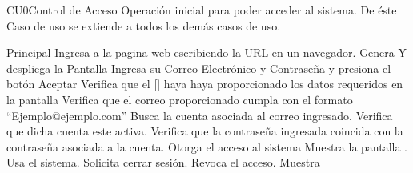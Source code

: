  \begin{UseCase}{CU0}{Control de Acceso}{
		Operación inicial para poder acceder al sistema. De éste Caso de uso se extiende a todos los demás casos de uso.
	}
	\end{UseCase}
	\begin{UCtrayectoria}{Principal}
		\UCpaso[\UCactor] Ingresa a la pagina web escribiendo la URL en un navegador.
		\UCpaso Genera Y despliega la Pantalla 
		\UCpaso [\UCactor] Ingresa su Correo Electrónico y Contraseña y presiona el botón Aceptar
		\UCpaso Verifica que el [\UCactor] haya haya proporcionado los datos requeridos en la pantalla 
		\UCpaso Verifica que el correo proporcionado cumpla con el formato ``Ejemplo@ejemplo.com'' 
		\UCpaso Busca la cuenta asociada al correo ingresado. 
		\UCpaso Verifica que dicha cuenta este activa. 
		\UCpaso Verifica que la contraseña ingresada coincida con la contraseña asociada a la cuenta.
		\UCpaso Otorga el acceso al sistema
		\UCpaso Muestra la pantalla .		
		\UCpaso [\UCactor] Usa el sistema.
		\UCpaso [\UCactor] Solicita cerrar sesión.
		\UCpaso Revoca el acceso.
		\UCpaso Muestra 		
	\end{UCtrayectoria}

